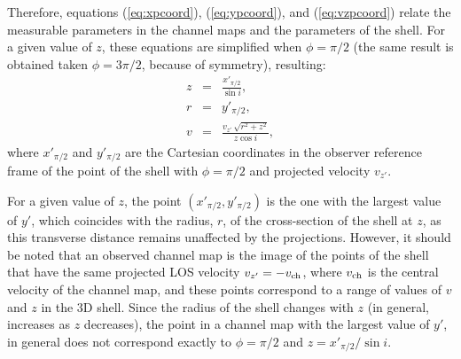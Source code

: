 \documentclass[12pt]{mythesis}
\begin{document}

Therefore, equations (\ref{eq:xpcoord}), (\ref{eq:ypcoord}), and (\ref{eq:vzpcoord}) relate the measurable parameters in the channel maps and the parameters of the shell. For a given value of $z$, these equations are simplified when $\phi=\pi/2$ (the same result is obtained taken $\phi=3\pi/2$, because of symmetry), resulting:
\begin{eqnarray}
\label{eq:zdprj}
z &=& \frac{x'_{\pi/2}}{\sin{i}},\\
\label{eq:Rdprj}
r &=& y'_{\pi/2},\\
\label{eq:vdprj}
v &=& \frac{v_{z'}\,\sqrt{r^2+z^2}}{z\cos i},
\end{eqnarray}
where $x'_{\pi/2}$ and $y'_{\pi/2}$ are the Cartesian coordinates in the observer reference frame of the point of the shell with $\phi=\pi/2$ and projected velocity $v_{z'}$.


 For a given value of $z$, the point $(x'_{\pi/2}, y'_{\pi/2})$ is the one with the largest value of $y'$, which coincides with the radius, $r$, of the cross-section of the shell at $z$, as this transverse distance remains unaffected by the projections. However, it should be noted that an observed channel map is the image of the points of the shell that have the same projected LOS velocity $v_{z'}=-v_{\rm ch}$, where $v_{\rm ch}$ is the central velocity of the channel map, and these points correspond to a range of values of $v$ and $z$ in the 3D shell. Since the radius of the shell changes with $z$ (in general, increases as $z$ decreases), the point in a channel map with the largest value of $y'$, in general does not correspond exactly to $\phi=\pi/2$ and $z=x'_{\pi/2} / \sin{i}$. 
\end{document}
